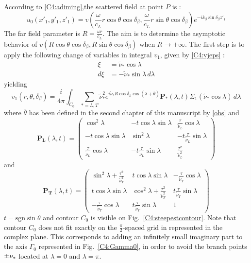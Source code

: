 According to \eqref{C4:adiming},the scattered field at point $P$ is :
\begin{equation}
u_0(x'_1,y'_1,z'_1)=v(\frac{\omega}{c_L}r\cos\theta\cos\delta_{\beta},\frac{\omega}{c_L}r\sin\theta\cos\delta_{\beta})e^{-ik_{\beta}\sin\delta_{\beta}z'_1}
\end{equation}
The far field parameter is $R=\frac{\omega r}{c_L}$. The aim is to determine the asymptotic behavior of $v(R\cos\theta\cos\delta_{\beta},R\sin\theta\cos\delta_{\beta})$ when $R\rightarrow +\infty$. The first step is to apply the following change of variables in integral $v_1$, given by \eqref{C4:vjeps} :
\begin{equation}
\begin{split}
\xi&=\tilde{\nu}_*\cos\lambda \\
d\xi&=-\tilde{\nu}_*\sin\lambda\, d\lambda
\end{split}
\label{C4:changevar2}
\end{equation}
yielding
\begin{equation}
v_1(r,\theta,\delta_{\beta})=\frac{i}{4\pi} \int_{C_0}\sum_{*=L,T}\tilde{\nu}_*^2 e^{i\tilde{\nu}_*R\cos\delta_{\beta}\cos(\lambda+\bar{\theta})}\mathbf{ P_*}(\lambda,t)\Sigma_1(\tilde{\nu}_*\cos\lambda) \, d \lambda
\label{C4:v1C0}
\end{equation}
where $\bar{\theta}$ has been defined in the second chapter of this manuscript by \eqref{obs} and
\begin{equation}
\mathbf{P_L}(\lambda,t)=
\begin{pmatrix}
\cos^2\lambda & -t\cos\lambda\sin\lambda &\frac{\tau}{\tilde{\nu}_L} \cos\lambda \\
-t\cos\lambda\sin\lambda & \sin^2\lambda&-t\frac{\tau}{\tilde{\nu}_L}\sin\lambda \\
\frac{\tau}{\tilde{\nu}_L} \cos\lambda&-t\frac{\tau}{\tilde{\nu}_L}\sin\lambda&\frac{\tau^2}{\tilde{\nu}_L^2}
\end{pmatrix}
\end{equation}
and
\begin{equation}
\mathbf{P_T}(\lambda,t)=
\begin{pmatrix}
\sin^2\lambda+\frac{\tau^2}{\tilde{\nu}_T^2} & t\cos\lambda\sin\lambda &-\frac{\tau}{\tilde{\nu}_T}\cos\lambda \\
t\cos\lambda\sin\lambda & \cos^2\lambda+\frac{\tau^2}{\tilde{\nu}_T^2}&t\frac{\tau}{\tilde{\nu}_T}\sin\lambda \\
-\frac{\tau}{\tilde{\nu}_T}\cos\lambda&t\frac{\tau}{\tilde{\nu}_T}\sin\lambda&1
\end{pmatrix}
\end{equation}
$t=\mbox{sgn} \sin\theta$ and contour $C_0$ is visible on Fig.~\ref{C4:steepestcontour}. Note that contour $C_0$ does not fit exactly on the $\frac{\pi}{2}$-spaced grid in represented in the complex plane. This corresponds to adding an infinitely small imaginary part to the axis $\Gamma_0$ represented in Fig.~\ref{C4:Gamma0}, in order to avoid the branch points $\pm \tilde{\nu}_*$ located at $\lambda=0$ and $\lambda=\pi$.

